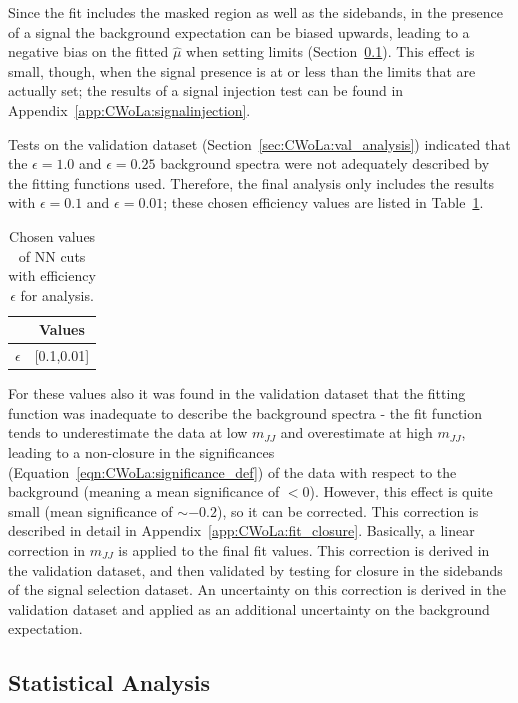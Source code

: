 Since the fit includes the masked region as well as the sidebands, in the presence of a signal the background expectation can be biased upwards, leading to a negative bias on the fitted $\hat{\mu}$ when setting limits (Section~\ref{sec:CWoLa:limits}).
This effect is small, though, when the signal presence is at or less than the limits that are actually set; the results of a signal injection test can be found in Appendix~\ref{app:CWoLa:signalinjection}.

Tests on the validation dataset (Section~\ref{sec:CWoLa:val_analysis}) indicated that the $\epsilon=1.0$ and $\epsilon=0.25$ background spectra were not adequately described by the fitting functions used.
Therefore, the final analysis only includes the results with $\epsilon=0.1$ and $\epsilon=0.01$; these chosen efficiency values are listed in Table~\ref{tab:effs_final}.
\begin{table}[htb]
  \centering
  \caption{Chosen values of NN cuts with efficiency $\epsilon$ for analysis.}
  \label{tab:effs_final}
  \begin{tabular}{c c}
    \hline
 & Values   \\ \hline
$\epsilon$ & [0.1,0.01] \\
    \hline
  \end{tabular}
\end{table}
For these values also it was found in the validation dataset that the fitting function was inadequate to describe the background spectra - the fit function tends to underestimate the data at low $m_{JJ}$ and overestimate at high $m_{JJ}$, leading to a non-closure in the significances (Equation~\ref{eqn:CWoLa:significance_def}) of the data with respect to the background (meaning a mean significance of $<0$).
However, this effect is quite small (mean significance of $\sim -0.2$), so it can be corrected.
This correction is described in detail in Appendix~\ref{app:CWoLa:fit_closure}.
Basically, a linear correction in $m_{JJ}$ is applied to the final fit values.
This correction is derived in the validation dataset, and then validated by testing for closure in the sidebands of the signal selection dataset.
An uncertainty on this correction is derived in the validation dataset and applied as an additional uncertainty on the background expectation.

\subsection{Statistical Analysis}
\label{sec:CWoLa:limits}

